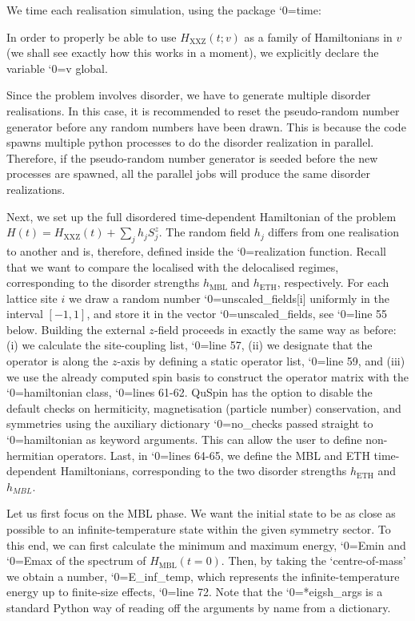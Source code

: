 \documentclass{SciPost}
\newcommand\0{\scalebox{-1}[1]{0}}
\let\svttfamily\ttfamily
\renewcommand\ttfamily{\svttfamily\catcode`0=\active }
\renewcommand\texttt{\bgroup\ttfamily\texttthelp}
\def\texttthelp#1{#1\egroup}
\begin{document}

%
We time each realisation simulation, using the package \texttt{time}:

%
In order to properly be able to use $H_\mathrm{XXZ}(t;v)$ as a family of Hamiltonians in $v$ (we shall see exactly how this works in a moment), we explicitly declare the variable \texttt{v} global.  

%
Since the problem involves disorder, we have to generate multiple disorder realisations. In this case, it is recommended to reset the pseudo-random number generator before any random numbers have been drawn. This is because the code spawns multiple python processes to do the disorder realization in parallel. Therefore, if the pseudo-random number generator is seeded before the new processes are spawned, all the parallel jobs will produce the same disorder realizations. 

%
Next, we set up the full disordered time-dependent Hamiltonian of the problem $H(t) = H_\mathrm{XXZ}(t) + \sum_j h_jS^z_j$. The random field $h_j$ differs from one realisation to another and is, therefore, defined inside the \texttt{realization} function. Recall that we want to compare the localised with the delocalised regimes, corresponding to the disorder strengths $h_\mathrm{MBL}$ and $h_\mathrm{ETH}$, respectively. For each lattice site $i$ we draw a random number \texttt{unscaled\_fields[i]} uniformly in the interval $[-1,1]$, and store it in the vector \texttt{unscaled\_fields}, see \texttt{line 55} below. Building the external $z$-field proceeds in exactly the same way as before: (i) we calculate the site-coupling list, \texttt{line 57}, (ii) we designate that the operator is along the $z$-axis by defining a static operator list, \texttt{line 59}, and (iii) we use the already computed spin basis to construct the operator matrix with the \texttt{hamiltonian} class, \texttt{lines 61-62}. QuSpin has the option to disable the default checks on hermiticity, magnetisation (particle number) conservation, and symmetries using the auxiliary dictionary \texttt{no\_checks} passed straight to \texttt{hamiltonian} as keyword arguments. This can allow the user to define non-hermitian operators. Last, in \texttt{lines 64-65}, we define the MBL and ETH time-dependent Hamiltonians, corresponding to the two disorder strengths $h_\mathrm{ETH}$ and $h_{MBL}$.  

%
Let us first focus on the MBL phase. We want the initial state to be as close as possible to an infinite-temperature state within the given symmetry sector. To this end, we can first calculate the minimum and maximum energy, \texttt{Emin} and \texttt{Emax} of the spectrum of $H_\mathrm{MBL}(t=0)$. Then, by taking the `centre-of-mass' we obtain a number, \texttt{E\_inf\_temp}, which represents the infinite-temperature energy up to finite-size effects, \texttt{line 72}. Note that the \texttt{**eigsh\_args} is a standard Python way of reading off the arguments by name from a dictionary.
\end{document}
